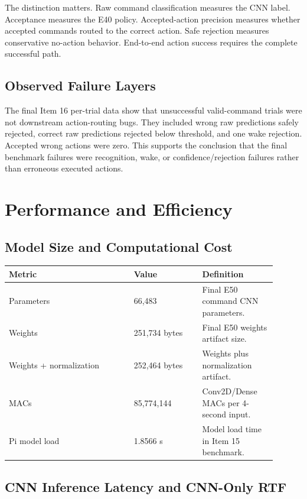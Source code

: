 \documentclass[11pt]{article}
\begin{document}
The distinction matters. Raw command classification measures the CNN label. Acceptance measures the E40 policy. Accepted-action precision measures whether accepted commands routed to the correct action. Safe rejection measures conservative no-action behavior. End-to-end action success requires the complete successful path.

\subsection{Observed Failure Layers}

The final Item 16 per-trial data show that unsuccessful valid-command trials were not downstream action-routing bugs. They included wrong raw predictions safely rejected, correct raw predictions rejected below threshold, and one wake rejection. Accepted wrong actions were zero. This supports the conclusion that the final benchmark failures were recognition, wake, or confidence/rejection failures rather than erroneous executed actions.

\section{Performance and Efficiency}

\subsection{Model Size and Computational Cost}

\begin{longtable}{p{0.42\linewidth}p{0.23\linewidth}p{0.25\linewidth}}
\toprule
\textbf{Metric} & \textbf{Value} & \textbf{Definition} \\
\midrule
Parameters & 66,483 & Final E50 command CNN parameters. \\
Weights & 251,734 bytes & Final E50 weights artifact size. \\
Weights + normalization & 252,464 bytes & Weights plus normalization artifact. \\
MACs & 85,774,144 & Conv2D/Dense MACs per 4-second input. \\
Pi model load & 1.8566 s & Model load time in Item 15 benchmark. \\
\bottomrule
\end{longtable}
\newpage
\subsection{CNN Inference Latency and CNN-Only RTF}
\end{document}
